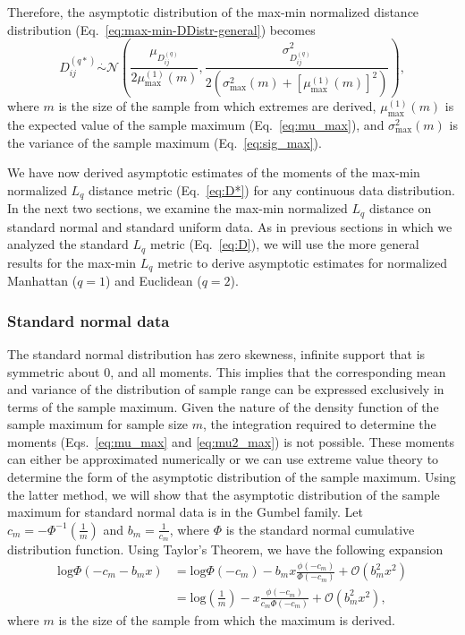 \documentclass[aoas]{imsart}
\begin{document}
Therefore, the asymptotic distribution of the max-min normalized distance distribution (Eq.~\ref{eq:max-min-DDistr-general}) becomes
%
\begin{equation}\label{eq:max-min_DDistr}
D^{(q*)}_{ij} \overset{.}{\sim} \mathcal{N}\left(\frac{\mu_{D^{(q)}_{ij}}}{2\mu^{(1)}_\text{max}(m)}, \frac{\sigma^2_{D^{(q)}_{ij}}}{2\left(\sigma^2_\text{max}(m) + \left[\mu^{(1)}_\text{max}(m)\right]^2\right)}\right),
\end{equation}
%
where $m$ is the size of the sample from which extremes are derived, $\mu^{(1)}_\text{max}(m)$ is the expected value of the sample maximum (Eq.~\ref{eq:mu_max}), and $\sigma^2_\text{max}(m)$ is the variance of the sample maximum (Eq.~\ref{eq:sig_max}). 

We have now derived asymptotic estimates of the moments of the max-min normalized $L_q$ distance metric (Eq.~\ref{eq:D*}) for any continuous data distribution. In the next two sections, we examine the max-min normalized $L_q$ distance on standard normal and standard uniform data. As in previous sections in which we analyzed the standard $L_q$ metric (Eq.~\ref{eq:D}), we will use the more general results for the max-min $L_q$ metric to derive asymptotic estimates for normalized Manhattan ($q=1$) and Euclidean ($q=2$).

\subsubsection{Standard normal data}

The standard normal distribution has zero skewness, infinite support that is symmetric about 0, and all moments. This implies that the corresponding mean and variance of the distribution of sample range can be expressed exclusively in terms of the sample maximum. Given the nature of the density function of the sample maximum for sample size $m$, the integration required to determine the moments (Eqs.~\ref{eq:mu_max} and \ref{eq:mu2_max}) is not possible. These moments can either be approximated numerically or we can use extreme value theory to determine the form of the asymptotic distribution of the sample maximum. Using the latter method, we will show that the asymptotic distribution of the sample maximum for standard normal data is in the Gumbel family. Let $c_m = -\Phi^{-1}\left(\frac{1}{m}\right)$ and $b_m = \frac{1}{c_m}$, where $\Phi$ is the standard normal cumulative distribution function. Using Taylor's Theorem, we have the following expansion
%
\begin{equation}\label{eq:log_expand}
\begin{aligned}
\text{log}\Phi(-c_m - b_m x) &= \text{log}\Phi(-c_m) - b_m x \frac{\phi(-c_m)}{\Phi(-c_m)} + \mathcal{O}(b^2_m x^2) \\
&= \text{log}\left(\frac{1}{m}\right) - x \frac{\phi(-c_m)}{c_m \Phi(-c_m)} + \mathcal{O}(b^2_m x^2),
\end{aligned}
\end{equation}
%
where $m$ is the size of the sample from which the maximum is derived.
\end{document}
